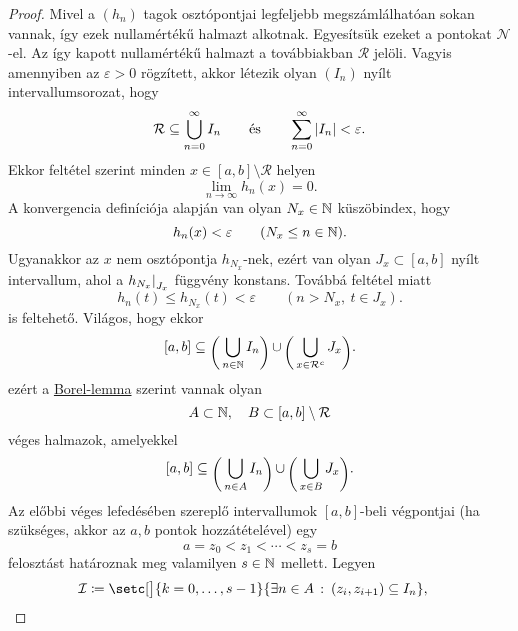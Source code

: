 \documentclass[
]{elteikthesis}[2024/04/26]
\begin{document}
	\begin{proof}
		Mivel a \( (h_n) \) tagok osztópontjai legfeljebb megszámlálhatóan sokan vannak, 
		így ezek nullamértékű halmazt alkotnak.
		Egyesítsük ezeket a pontokat \( \mathcal{N} \)-el.
		Az így kapott nullamértékű halmazt a továbbiakban \( \mathcal{R} \) jelöli.
		Vagyis amennyiben az \( \varepsilon > 0 \) rögzített, 
		akkor létezik olyan \( (I_n) \) nyílt intervallumsorozat, hogy
		\[
			\mathcal{R} \subseteq \bigcup_{n=0}^{\infty} I_n
			\qquad \text{és} \qquad
			\sum_{n=0}^{\infty} \abs{I_n} < \varepsilon.
		\]		
		Ekkor  feltétel szerint 
		minden \( x \in [a,b] \setminus \mathcal{R} \) helyen
		\[
			\lim_{n \to \infty} h_n(x) = 0.
		\]
		A konvergencia definíciója alapján van olyan \( N_x \in \mathbb{N} \) küszöbindex, hogy
		\[
			h_n(x) < \varepsilon
			\qquad (N_x \leq n \in \mathbb{N}).
		\]
		Ugyanakkor az \( x \) nem osztópontja \( h_{N_x} \)-nek, 
		ezért van olyan \( J_x \subset [a, b] \) nyílt intervallum, 
		ahol a \( \restr{h_{N_x}}{J_x} \) függvény konstans.
		Továbbá  feltétel miatt
		\begin{equation}\label{eq:riesz-a-lemma-03}
			h_n(t) \leq h_{N_x}(t) < \varepsilon \qquad (n > N_x, \ t \in J_x).
			\tag{\( * \)}
		\end{equation}
		is feltehető. Világos, hogy ekkor
		\[
			[a, b] \subseteq
			\mathopen{\raisebox{-0.9ex}{$ \biggl( $}}\,
			\bigcup_{n \in \N} I_n
			\mathopen{\raisebox{-0.9ex}{$ \biggr) $}}
			\, \cup \,
			\mathopen{\raisebox{-0.9ex}{$ \biggl( $}}\,
			\bigcup_{x \in \mathcal{R}^c} J_x
			\mathopen{\raisebox{-0.9ex}{$ \biggr) $}}.
		\]
		ezért a \hyperref[lem:borel]{Borel-lemma} szerint vannak olyan
		\[
			A \subset \mathbb{N}, \quad
			B \subset [a, b] \setminus \mathcal{R}
		\]
		véges halmazok, amelyekkel
		\[
			[a, b] \subseteq
			\mathopen{\raisebox{-0.9ex}{$ \biggl( $}}\,
			\bigcup_{n \in A} I_n
			\mathopen{\raisebox{-0.9ex}{$ \biggr) $}}
			\, \cup \,
			\mathopen{\raisebox{-0.9ex}{$ \biggl( $}}\,
			\bigcup_{x \in B} J_x
			\mathopen{\raisebox{-0.9ex}{$ \biggr) $}}.
		\]
		Az előbbi véges lefedésében szereplő intervallumok \( [a, b] \)-beli végpontjai 
		(ha	szükséges, akkor az \( a, b \) pontok hozzátételével) egy
		\[
			a = z_0 < z_1 < \cdots < z_s = b
		\]
		felosztást határoznak meg valamilyen \( s \in \mathbb{N} \) mellett. Legyen
		\[
			\mathcal{I} \coloneq 
			\setc[\big]{ k = 0,\dots,s-1 }
			           { \exists n \in A \ \colon \, (z_i, z_{i+1}) \subseteq I_n }, \quad
\]
\end{proof}
\end{document}
